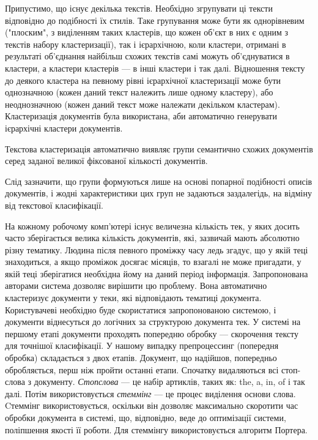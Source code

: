 Припустимо, що існує декілька текстів. Необхідно згрупувати ці тексти відповідно до подібності їх стилів. Таке групування може бути як однорівневим ("плоским", з виділенням таких кластерів, що кожен об'єкт в них є одним з текстів набору кластеризації), так і ієрархічною, коли кластери, отримані в результаті об'єднання найбільш схожих текстів самі можуть об'єднуватися в кластери, а кластери кластерів — в інші кластери і так далі. Відношення тексту до деякого кластера на певному рівні ієрархічної кластеризації може бути однозначною (кожен даний текст належить лише одному кластеру), або неоднозначною (кожен даний текст може належати декільком кластерам). Кластеризація документів була використана, аби автоматично генерувати ієрархічні кластери документів.

Текстова кластеризація автоматично виявляє групи семантично схожих документів серед заданої великої фіксованої кількості документів.

Слід зазначити, що групи формуються лише на основі попарної подібності описів документів, і жодні характеристики цих груп не задаються заздалегідь, на відміну від текстової класифікації.

На кожному робочому комп'ютері існує величезна кількість тек, у яких досить часто зберігається велика кількість документів, які, зазвичай мають абсолютно різну тематику. Людина після певного проміжку часу ледь згадує, що у якій теці знаходиться, а якщо проміжок досягає місяців, то взагалі не може пригадати, у якій теці зберігатися необхідна йому на даний період інформація. Запропонована авторами система дозволяє вирішити цю проблему. Вона автоматично кластеризує документи у теки, які відповідають тематиці документа. Користувачеві необхідно буде скористатися запропонованою системою, і документи віднесуться до логічних за структурою документа тек. У системі на першому етапі документи проходять попередню обробку — скорочення тексту для точнішої класифікації. У нашому випадку препроцессинг (попередня обробка) складається з двох етапів. Документ, що надійшов, попередньо обробляється, перш ніж пройти останні етапи. Спочатку видаляються всі стоп-слова з документу. \textit{Стопслова} — це набір артиклів, таких як: the, a, in, of і так далі. Потім використовується \textit{стеммінг} — це процес виділення основи слова. Cтеммінг використовується, оскільки він дозволяє максимально скоротити час обробки документа в системі, що, відповідно, веде до оптимізації системи, поліпшення якості її роботи. Для стеммінгу використовується алгоритм Портера.

